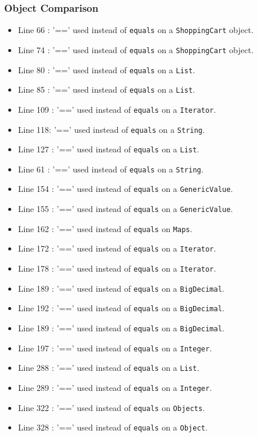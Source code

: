 
\subsubsection{Object Comparison}
\begin{itemize}
\item Line 66 : '==' used instead of \texttt{equals} on a \texttt{ShoppingCart} object.
\item Line 74 : '==' used instead of \texttt{equals} on a \texttt{ShoppingCart} object.
\item Line 80 : '==' used instead of \texttt{equals} on a \texttt{List}.
\item Line 85 : '==' used instead of \texttt{equals} on a \texttt{List}.
\item Line 109 : '==' used instead of \texttt{equals} on a \texttt{Iterator}.
\item Line 118: '==' used instead of \texttt{equals} on a \texttt{String}.
\item Line 127 : '==' used instead of \texttt{equals} on a \texttt{List}.
\item Line 61 : '==' used instead of \texttt{equals} on a \texttt{String}.
\item Line 154 : '==' used instead of \texttt{equals} on a \texttt{GenericValue}.
\item Line 155 : '==' used instead of \texttt{equals} on a \texttt{GenericValue}.
\item Line 162 : '==' used instead of \texttt{equals} on  \texttt{Maps}.
\item Line 172 : '==' used instead of \texttt{equals} on a \texttt{Iterator}.
\item Line 178 : '==' used instead of \texttt{equals} on a \texttt{Iterator}.
\item Line 189 : '==' used instead of \texttt{equals} on a \texttt{BigDecimal}.
\item Line 192 : '==' used instead of \texttt{equals} on a \texttt{BigDecimal}.
\item Line 189 : '==' used instead of \texttt{equals} on a \texttt{BigDecimal}.
\item Line 197 : '==' used instead of \texttt{equals} on a \texttt{Integer}.
\item Line 288 : '==' used instead of \texttt{equals} on a \texttt{List}.
\item Line 289 : '==' used instead of \texttt{equals} on a \texttt{Integer}.
\item Line 322 : '==' used instead of \texttt{equals} on  \texttt{Objects}.
\item Line 328 : '==' used instead of \texttt{equals} on a \texttt{Object}.
\end{itemize}
